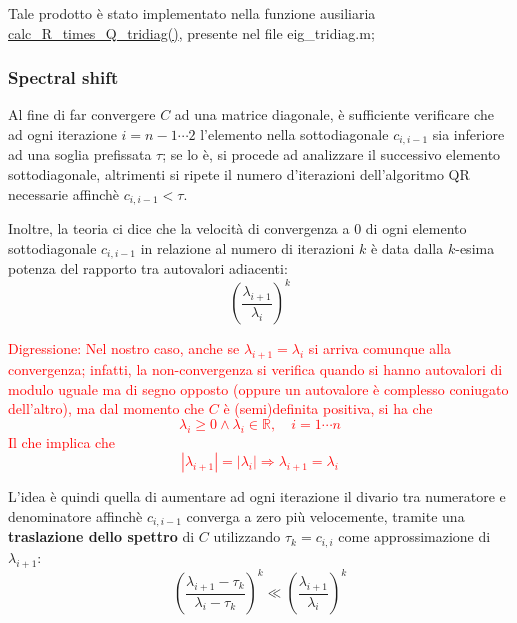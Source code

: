 Tale prodotto è stato implementato nella funzione ausiliaria \\
\href{https://github.com/Yagotzirck/svd_benchmark/blob/61d9bdf69b0431b83079c767cf2fc036bdc601a2/src/eig_tridiag.m#L60}{calc\_R\_times\_Q\_tridiag()}, 
presente nel file eig\_tridiag.m;

\subsubsection{Spectral shift}
Al fine di far convergere $C$ ad una matrice diagonale, è sufficiente verificare 
che ad ogni iterazione $i = n-1 \cdots 2$ l'elemento nella sottodiagonale 
$c_{i,i-1}$ sia inferiore ad una soglia prefissata $\tau$; se lo è, si procede 
ad analizzare il successivo elemento sottodiagonale, altrimenti si ripete il 
numero d'iterazioni dell'algoritmo QR necessarie affinchè $c_{i,i-1} < \tau$.

Inoltre, la teoria ci dice che la velocità di convergenza a 0 di ogni elemento 
sottodiagonale $c_{i,i-1}$ in relazione al numero di iterazioni $k$ è data dalla 
$k$-esima potenza del rapporto tra autovalori adiacenti:
\begin{equation*}
	\left( \frac{\lambda_{i+1}}{\lambda_i} \right)^k
\end{equation*}

\textcolor{red}{
Digressione: Nel nostro caso, anche se $\lambda_{i+1} = \lambda_i$ si arriva 
comunque alla convergenza; infatti, la non-convergenza si verifica quando si 
hanno autovalori di modulo uguale ma di segno opposto (oppure un autovalore è 
complesso coniugato dell'altro), ma dal momento che $C$ è (semi)definita 
positiva, si ha che
\begin{equation*}
	\lambda_i \geq 0 \wedge \lambda_i \in \mathbb{R}, \quad i = 1 \cdots n 
\end{equation*}
Il che implica che
\begin{equation*}
	|\lambda_{i+1}| = |\lambda_i| \Rightarrow \lambda_{i+1} = \lambda_i
\end{equation*}
}

L'idea è quindi quella di aumentare ad ogni iterazione il divario tra numeratore 
e denominatore affinchè $c_{i,i-1}$ converga a zero più velocemente, tramite una 
\textbf{traslazione dello spettro} di $C$ utilizzando $\tau_k = c_{i,i}$ come 
approssimazione di $\lambda_{i+1}$:
\begin{equation*}
	\left( \frac{\lambda_{i+1} - \tau_k}{\lambda_i - \tau_k} \right)^k \ll \left( 
\frac{\lambda_{i+1}}{\lambda_i} \right)^k
\end{equation*}

